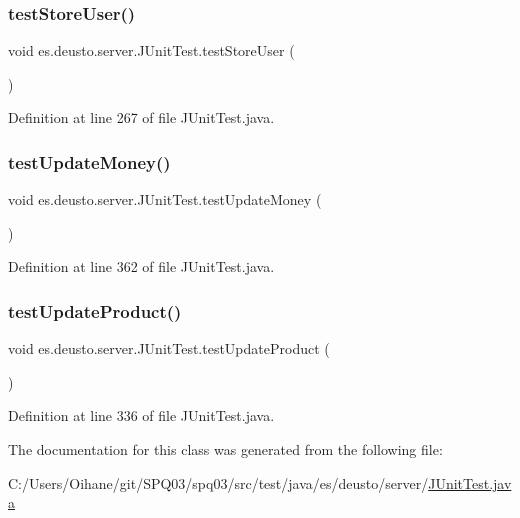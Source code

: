 \subsubsection{\texorpdfstring{test\+Store\+User()}{testStoreUser()}}
{\footnotesize\ttfamily void es.\+deusto.\+server.\+J\+Unit\+Test.\+test\+Store\+User (\begin{DoxyParamCaption}{ }\end{DoxyParamCaption})}



Definition at line 267 of file J\+Unit\+Test.\+java.

\mbox{\label{classes_1_1deusto_1_1server_1_1_j_unit_test_aaad8cae59ca19f9dba654a12f695dbd0}} 
\subsubsection{\texorpdfstring{test\+Update\+Money()}{testUpdateMoney()}}
{\footnotesize\ttfamily void es.\+deusto.\+server.\+J\+Unit\+Test.\+test\+Update\+Money (\begin{DoxyParamCaption}{ }\end{DoxyParamCaption})}



Definition at line 362 of file J\+Unit\+Test.\+java.

\mbox{\label{classes_1_1deusto_1_1server_1_1_j_unit_test_a6af88e3e3ad84aed02c23286c5d2a178}} 
\subsubsection{\texorpdfstring{test\+Update\+Product()}{testUpdateProduct()}}
{\footnotesize\ttfamily void es.\+deusto.\+server.\+J\+Unit\+Test.\+test\+Update\+Product (\begin{DoxyParamCaption}{ }\end{DoxyParamCaption})}



Definition at line 336 of file J\+Unit\+Test.\+java.



The documentation for this class was generated from the following file\+:\begin{DoxyCompactItemize}
\item 
C\+:/\+Users/\+Oihane/git/\+S\+P\+Q03/spq03/src/test/java/es/deusto/server/\hyperlink{_j_unit_test_8java}{J\+Unit\+Test.\+java}\end{DoxyCompactItemize}
